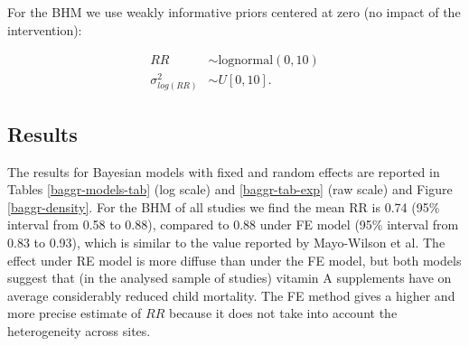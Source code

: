 \documentclass[12pt]{article}
\begin{document}

For the BHM we use weakly informative priors centered at zero (no impact of the intervention):

\begin{equation} \label{lognormal priors}
\begin{aligned}
RR &\sim  \text{lognormal}(0,10) \\
\sigma^2_{log(RR)} &\sim U[0,10].
\end{aligned}
\end{equation}



\subsection{ Results  }


The results for Bayesian models with fixed and random effects are reported in Tables \ref{baggr-models-tab} (log scale) and \ref{baggr-tab-exp} (raw scale) and Figure \ref{baggr-density}. For the BHM of all studies we find the mean RR is 0.74 (95\% interval from 0.58 to 0.88), compared to 0.88 under FE model (95\% interval from 0.83 to 0.93), which is similar to the value reported by Mayo-Wilson et al.
The effect under RE model is more diffuse than under the FE model, but both models suggest that (in the analysed sample of studies) vitamin A supplements have on average considerably reduced child mortality. The FE method gives a higher and more precise estimate of $RR$ because it does not take into account the heterogeneity across sites. 
\end{document}

